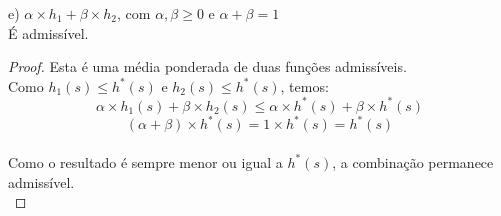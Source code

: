 \documentclass[a4paper,12pt]{article}
\begin{document}
e) $\alpha \times h_1 + \beta \times h_2$, com $\alpha, \beta \geq 0$ e $\alpha + \beta = 1$\\

É admissível.

\begin{proof}
Esta é uma média ponderada de duas funções admissíveis. \\
Como $h_1(s) \leq h^*(s)$ e $h_2(s) \leq h^*(s)$, temos:\\
$$\alpha \times h_1(s) + \beta \times h_2(s) \leq \alpha \times h^*(s) + \beta \times h^*(s)$$ $$(\alpha + \beta) \times h^*(s) = 1 \times h^*(s) = h^*(s)$$ \\
Como o resultado é sempre menor ou igual a $h^*(s)$, a combinação permanece admissível. \\
\end{proof} 
\end{document}
